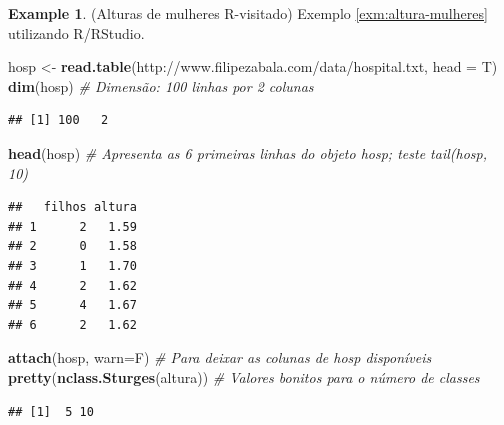 \documentclass[
]{book}
\newenvironment{Shaded}{\begin{snugshade}}{\end{snugshade}}
\newcommand{\CommentTok}[1]{\textcolor[rgb]{0.56,0.35,0.01}{\textit{#1}}}
\newcommand{\DataTypeTok}[1]{\textcolor[rgb]{0.13,0.29,0.53}{#1}}
\newcommand{\KeywordTok}[1]{\textcolor[rgb]{0.13,0.29,0.53}{\textbf{#1}}}
\newcommand{\NormalTok}[1]{#1}
\newcommand{\OperatorTok}[1]{\textcolor[rgb]{0.81,0.36,0.00}{\textbf{#1}}}
\newcommand{\StringTok}[1]{\textcolor[rgb]{0.31,0.60,0.02}{#1}}
\theoremstyle{definition}
\theoremstyle{definition}
\newtheorem{example}{Example}[chapter]
\theoremstyle{definition}
\theoremstyle{remark}
\begin{document}
\begin{example}
\protect\hypertarget{exm:altura-mulheres-r}{}{\label{exm:altura-mulheres-r} }(Alturas de mulheres R-visitado) Exemplo \ref{exm:altura-mulheres} utilizando R/RStudio.
\end{example}

\begin{Shaded}
\begin{Highlighting}[]
\NormalTok{hosp \textless{}{-}}\StringTok{ }\KeywordTok{read.table}\NormalTok{(}\StringTok{\textquotesingle{}http://www.filipezabala.com/data/hospital.txt\textquotesingle{}}\NormalTok{, }\DataTypeTok{head =}\NormalTok{ T)}
\KeywordTok{dim}\NormalTok{(hosp)       }\CommentTok{\# Dimensão: 100 linhas por 2 colunas}
\end{Highlighting}
\end{Shaded}

\begin{verbatim}
## [1] 100   2
\end{verbatim}

\begin{Shaded}
\begin{Highlighting}[]
\KeywordTok{head}\NormalTok{(hosp)      }\CommentTok{\# Apresenta as 6 primeiras linhas do objeto \textquotesingle{}hosp\textquotesingle{}; teste tail(hosp, 10)}
\end{Highlighting}
\end{Shaded}

\begin{verbatim}
##   filhos altura
## 1      2   1.59
## 2      0   1.58
## 3      1   1.70
## 4      2   1.62
## 5      4   1.67
## 6      2   1.62
\end{verbatim}

\begin{Shaded}
\begin{Highlighting}[]
\KeywordTok{attach}\NormalTok{(hosp, }\DataTypeTok{warn=}\NormalTok{F)                  }\CommentTok{\# Para deixar as colunas de \textquotesingle{}hosp\textquotesingle{} disponíveis}
\KeywordTok{pretty}\NormalTok{(}\KeywordTok{nclass.Sturges}\NormalTok{(altura))        }\CommentTok{\# Valores \textquotesingle{}bonitos\textquotesingle{} para o número de classes}
\end{Highlighting}
\end{Shaded}

\begin{verbatim}
## [1]  5 10
\end{verbatim}

\begin{Shaded}
\end{Shaded}
\end{document}
